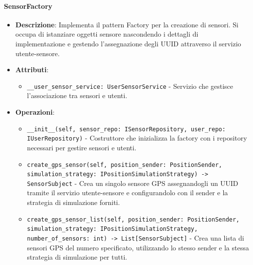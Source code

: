 \documentclass[10pt]{article}
\begin{document}
    \paragraph{SensorFactory}
    \begin{itemize} 
    \item \textbf{Descrizione}: Implementa il pattern Factory per la creazione di sensori. Si occupa di istanziare oggetti sensore nascondendo i dettagli di implementazione e gestendo l'assegnazione degli UUID attraverso il servizio utente-sensore.
    \item \textbf{Attributi}:
    \begin{itemize}
        \item \texttt{\_\_user\_sensor\_service: UserSensorService} - Servizio che gestisce l'associazione tra sensori e utenti.
    \end{itemize}
    
    \item \textbf{Operazioni}:
    \begin{itemize}
        \item \texttt{\_\_init\_\_(self, sensor\_repo: ISensorRepository, user\_repo: IUserRepository)} - Costruttore che inizializza la factory con i repository necessari per gestire sensori e utenti.
        
        \item \texttt{create\_gps\_sensor(self, position\_sender: PositionSender, simulation\_strategy: IPositionSimulationStrategy) -> SensorSubject} - Crea un singolo sensore GPS assegnandogli un UUID tramite il servizio utente-sensore e configurandolo con il sender e la strategia di simulazione forniti.
        
        \item \texttt{create\_gps\_sensor\_list(self, position\_sender: PositionSender, simulation\_strategy: IPositionSimulationStrategy, number\_of\_sensors: int) -> List[SensorSubject]} - Crea una lista di sensori GPS del numero specificato, utilizzando lo stesso sender e la stessa strategia di simulazione per tutti.
    \end{itemize}
    \end{itemize}
\end{document}
